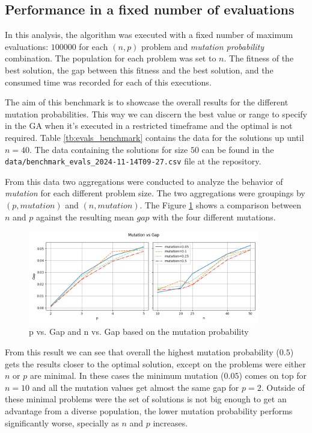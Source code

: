 \documentclass[onecolumn]{IEEEtran}
\def\code#1{\texttt{#1}}
\begin{document}
\subsection{Performance in a fixed number of evaluations\label{ss:benchmark_evaluations}}

In this analysis, the algorithm was executed with a fixed number of maximum evaluations: $100000$
for each $(n,p)$ problem and \emph{mutation probability} combination. The population for each
problem was set to $n$. The fitness of the best solution, the gap between this fitness and the best
solution, and the consumed time was recorded for each of this executions.

The aim of this benchmark is to showcase the overall results for the different mutation probabilities.
This way we can discern the best value or range to specify in the GA when it's executed in a restricted
timeframe and the optimal is not required.  Table \ref{tb:evals_benchmark}
contains the data for the solutions up until $n=40$. The data containing the solutions for size $50$
can be found in the \code{data/benchmark\_evals\_2024-11-14T09-27.csv} file at the repository\cite{SotoEstevezGA2024}.



From this data two aggregations were conducted to analyze the behavior of \emph{mutation} for each
different problem size. The two aggregations were groupings by $(p,mutation)$ and $(n,mutation)$.
The Figure \ref{fig:mutation_vs_gap}
shows a comparison between $n$ and $p$ against the resulting mean $gap$ with the four different mutations.

\begin{figure}[h!]
  \centering
  \includegraphics[width=0.9\textwidth]{figures/mutation_vs_gap.png}
  \caption{p vs. Gap and n vs. Gap based on the mutation probability}
  \label{fig:mutation_vs_gap}
\end{figure}

From this result we can see that overall the highest mutation probability ($0.5$) gets the results
closer to the optimal solution, except on the problems were either $n$ or $p$ are minimal. In these
cases the minimum mutation ($0.05$) comes on top for $n=10$ and all the mutation values get almost
the same gap for $p=2$. Outside of these minimal problems were the set of solutions is not big
enough to get an advantage from a diverse population, the lower mutation probability performs
significantly worse, specially as $n$ and $p$ increases.
\end{document}
